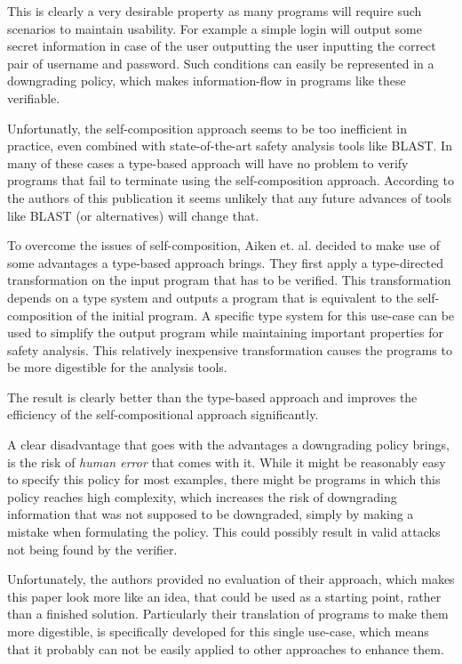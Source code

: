 \documentclass[a4paper,UKenglish]{lipics-v2018}
\begin{document}
This is clearly a very desirable property as many programs will require such scenarios to maintain usability. For example a simple login will output some secret information in case of the user outputting the user inputting the correct pair of username and password. Such conditions can easily be represented in a downgrading policy, which makes information-flow in programs like these verifiable.\cite{secure_information_flow_safety}

Unfortunatly, the self-composition approach seems to be too inefficient in practice, even combined with state-of-the-art safety analysis tools like BLAST. In many of these cases a type-based approach will have no problem to verify programs that fail to terminate using the self-composition approach. According to the authors of this publication it seems unlikely that any future advances of tools like BLAST (or alternatives) will change that.\cite{secure_information_flow_safety}

To overcome the issues of self-composition, Aiken et. al. decided to make use of some advantages a type-based approach brings. They first apply a type-directed transformation on the input program that has to be verified. This transformation depends on a type system and outputs a program that is equivalent to the self-composition of the initial program. A specific type system for this use-case can be used to simplify the output program while maintaining important properties for safety analysis. This relatively inexpensive transformation causes the programs to be more digestible for the analysis tools. 
\cite{secure_information_flow_safety}

The result is clearly better than the type-based approach and improves the efficiency of the self-compositional approach significantly.
\cite{secure_information_flow_safety}

A clear disadvantage that goes with the advantages a downgrading policy brings, is the risk of \textit{human error} that comes with it. While it might be reasonably easy to specify this policy for most examples, there might be programs in which this policy reaches high complexity, which increases the risk of downgrading information that was not supposed to be downgraded, simply by making a mistake when formulating the policy. This could possibly result in valid attacks not being found by the verifier.

Unfortunately, the authors provided no evaluation of their approach, which makes this paper look more like an idea, that could be used as a starting point, rather than a finished solution. Particularly their translation of programs to make them more digestible, is specifically developed for this single use-case, which means that it probably can not be easily applied to other approaches to enhance them.
\end{document}
